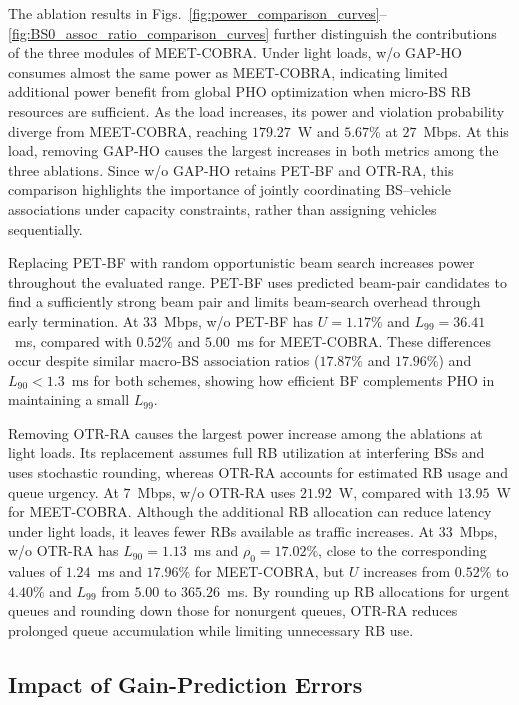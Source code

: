 \documentclass[10pt,journal,letterpaper]{IEEEtran}
\newcommand{\rev}[1]{\textcolor{revisioncolor}{{}#1}}
\theoremstyle{remark}
\begin{document}
\rev{The ablation results in Figs.~\ref{fig:power_comparison_curves}--\ref{fig:BS0_assoc_ratio_comparison_curves} further distinguish the contributions of the three modules of MEET-COBRA. Under light loads, w/o GAP-HO consumes almost the same power as MEET-COBRA, indicating limited additional power benefit from global PHO optimization when micro-BS RB resources are sufficient. As the load increases, its power and violation probability diverge from MEET-COBRA, reaching $179.27$~W and $5.67\%$ at $27$~Mbps. At this load, removing GAP-HO causes the largest increases in both metrics among the three ablations. Since w/o GAP-HO retains PET-BF and OTR-RA, this comparison highlights the importance of jointly coordinating BS--vehicle associations under capacity constraints, rather than assigning vehicles sequentially.}

\rev{Replacing PET-BF with random opportunistic beam search increases power throughout the evaluated range. PET-BF uses predicted beam-pair candidates to find a sufficiently strong beam pair and limits beam-search overhead through early termination. At $33$~Mbps, w/o PET-BF has $U=1.17\%$ and $L_{99}=36.41$~ms, compared with $0.52\%$ and $5.00$~ms for MEET-COBRA. These differences occur despite similar macro-BS association ratios ($17.87\%$ and $17.96\%$) and $L_{90}<1.3$~ms for both schemes, showing how efficient BF complements PHO in maintaining a small $L_{99}$.}

\rev{Removing OTR-RA causes the largest power increase among the ablations at light loads. Its replacement assumes full RB utilization at interfering BSs and uses stochastic rounding, whereas OTR-RA accounts for estimated RB usage and queue urgency. At $7$~Mbps, w/o OTR-RA uses $21.92$~W, compared with $13.95$~W for MEET-COBRA. Although the additional RB allocation can reduce latency under light loads, it leaves fewer RBs available as traffic increases. At $33$~Mbps, w/o OTR-RA has $L_{90}=1.13$~ms and $\rho_0=17.02\%$, close to the corresponding values of $1.24$~ms and $17.96\%$ for MEET-COBRA, but $U$ increases from $0.52\%$ to $4.40\%$ and $L_{99}$ from $5.00$ to $365.26$~ms. By rounding up RB allocations for urgent queues and rounding down those for nonurgent queues, OTR-RA reduces prolonged queue accumulation while limiting unnecessary RB use.}


\subsection{\rev{Impact of Gain-Prediction Errors}}
\label{subsection:gain-prediction-errors}
\end{document}
